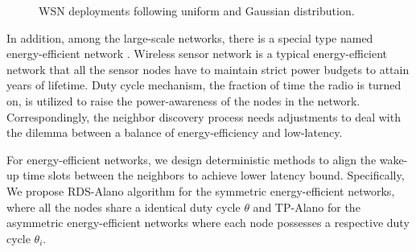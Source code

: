  
 \begin{figure}[!t]
\centering
{}
\vspace{0.03in}
\caption{WSN deployments following uniform and Gaussian distribution.}
\label{distribution}
\end{figure}


In addition, among the large-scale networks, there is a special 
type named energy-efficient network \cite{jones2001survey}.
Wireless sensor network is a typical energy-efficient network that all the sensor nodes have to maintain 
strict power budgets to attain years of lifetime\cite{dunkels2011contikimac}.
Duty cycle mechanism, the fraction of time the radio is turned on, is 
utilized to raise the power-awareness of the nodes in the network.
Correspondingly, the neighbor discovery process 
needs adjustments to deal with the dilemma between 
a balance of energy-efficiency and low-latency.


For energy-efficient networks, we design deterministic methods
to align the wake-up time slots between the neighbors to achieve lower latency bound.
Specifically, We propose RDS-Alano algorithm for the symmetric energy-efficient networks, where 
all the nodes share a identical duty cycle $\theta$ and TP-Alano for the
asymmetric energy-efficient networks where each node possesses a respective duty cycle $\theta_i$. 


